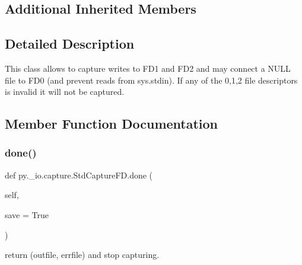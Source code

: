 \subsection*{Additional Inherited Members}


\subsection{Detailed Description}
\begin{DoxyVerb}This class allows to capture writes to FD1 and FD2
    and may connect a NULL file to FD0 (and prevent
    reads from sys.stdin).  If any of the 0,1,2 file descriptors
    is invalid it will not be captured.
\end{DoxyVerb}
 

\subsection{Member Function Documentation}
\mbox{\label{classpy_1_1__io_1_1capture_1_1_std_capture_f_d_aa6d30151b553acf2388dde62347424b8}} 
\subsubsection{\texorpdfstring{done()}{done()}}
{\footnotesize\ttfamily def py.\+\_\+io.\+capture.\+Std\+Capture\+F\+D.\+done (\begin{DoxyParamCaption}\item[{}]{self,  }\item[{}]{save = {\ttfamily True} }\end{DoxyParamCaption})}

\begin{DoxyVerb}return (outfile, errfile) and stop capturing. \end{DoxyVerb}
 \mbox{\label{classpy_1_1__io_1_1capture_1_1_std_capture_f_d_adbd69a690c67424fd006f48ed7b672cd}} 
